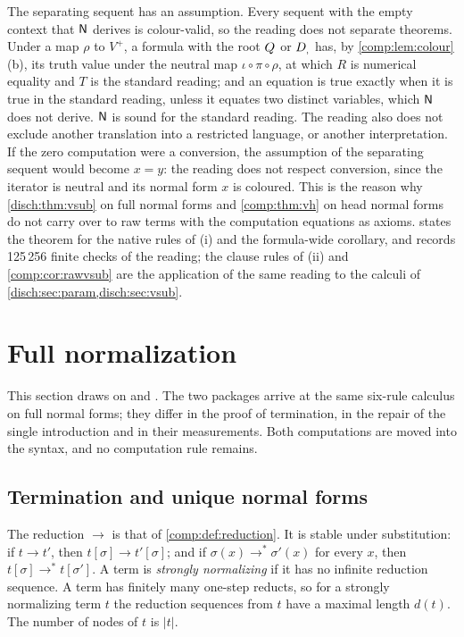 \begin{remark}
\label{comp:rem:rawvsub}
The separating sequent has an assumption. Every sequent with the empty
context that $\mathsf{N}$ derives is colour-valid, so the reading does not
separate theorems. Under a map $\rho$ to $V^{+}$, a formula with the root
$Q_{}$ or $D_{,}$ has, by \cref{comp:lem:colour}(b), its truth value under
the neutral map $\iota\circ\pi\circ\rho$, at which $R$ is numerical equality
and $T$ is the standard reading; and an equation is true exactly when it is
true in the standard reading, unless it equates two distinct variables,
which $\mathsf{N}$ does not derive. $\mathsf{N}$ is sound for the standard reading. The reading also does not exclude another translation into a
restricted language, or another interpretation. If the zero computation were
a conversion, the assumption of the separating sequent would become $x=y$:
the reading does not respect conversion, since the iterator is neutral and
its normal form $x$ is coloured. This is the reason why
\cref{disch:thm:vsub} on full normal forms and \cref{comp:thm:vh} on head
normal forms do not carry over to raw terms with the computation equations
as axioms.  states the theorem for the native rules of
(i) and the formula-wide corollary, and records 125\,256 finite checks of
the reading; the clause rules of (ii) and \cref{comp:cor:rawvsub} are the
application of the same reading to the calculi of
\cref{disch:sec:param,disch:sec:vsub}.
\end{remark}

\section{Full normalization}
\label{comp:sec:full}

This section draws on  and
. The two packages arrive at the same six-rule
calculus on full normal forms; they differ in the proof of termination, in
the repair of the single introduction and in their measurements. Both
computations are moved into the syntax, and no computation rule remains.

\subsection{Termination and unique normal forms}

The reduction $\to$ is that of \cref{comp:def:reduction}. It is stable under
substitution: if $t\to t'$, then $t[\sigma]\to t'[\sigma]$; and if
$\sigma(x)\to^{*}\sigma'(x)$ for every $x$, then
$t[\sigma]\to^{*}t[\sigma']$. A term is \emph{strongly normalizing} if it
has no infinite reduction sequence. A term has finitely many one-step
reducts, so for a strongly normalizing term $t$ the reduction sequences from
$t$ have a maximal length $d(t)$. The number of nodes of $t$ is $|t|$.

